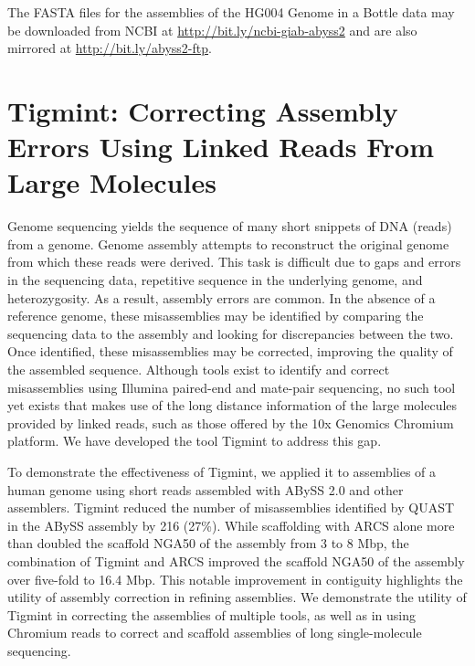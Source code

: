 \documentclass[
  12pt,
  oneside,
  openany]{book}
\begin{document}
The FASTA files for the assemblies of the HG004 Genome in a Bottle data may be downloaded from NCBI at \url{http://bit.ly/ncbi-giab-abyss2} and are also mirrored at \url{http://bit.ly/abyss2-ftp}.

\hypertarget{tigmint-correcting-assembly-errors-using-linked-reads-from-large-molecules}{%
\chapter{Tigmint: Correcting Assembly Errors Using Linked Reads From Large Molecules}\label{tigmint-correcting-assembly-errors-using-linked-reads-from-large-molecules}}


Genome sequencing yields the sequence of many short snippets of DNA (reads) from a genome. Genome assembly attempts to reconstruct the original genome from which these reads were derived. This task is difficult due to gaps and errors in the sequencing data, repetitive sequence in the underlying genome, and heterozygosity. As a result, assembly errors are common. In the absence of a reference genome, these misassemblies may be identified by comparing the sequencing data to the assembly and looking for discrepancies between the two. Once identified, these misassemblies may be corrected, improving the quality of the assembled sequence. Although tools exist to identify and correct misassemblies using Illumina paired-end and mate-pair sequencing, no such tool yet exists that makes use of the long distance information of the large molecules provided by linked reads, such as those offered by the 10x Genomics Chromium platform. We have developed the tool Tigmint to address this gap.

To demonstrate the effectiveness of Tigmint, we applied it to assemblies of a human genome using short reads assembled with ABySS 2.0 and other assemblers. Tigmint reduced the number of misassemblies identified by QUAST in the ABySS assembly by 216 (27\%). While scaffolding with ARCS alone more than doubled the scaffold NGA50 of the assembly from 3 to 8 Mbp, the combination of Tigmint and ARCS improved the scaffold NGA50 of the assembly over five-fold to 16.4 Mbp. This notable improvement in contiguity highlights the utility of assembly correction in refining assemblies. We demonstrate the utility of Tigmint in correcting the assemblies of multiple tools, as well as in using Chromium reads to correct and scaffold assemblies of long single-molecule sequencing.
\end{document}
